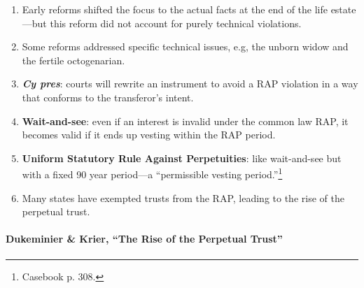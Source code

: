 \begin{enumerate}
    \item Early reforms shifted the focus to the actual facts at the end of 
    the life estate---but this reform did not account for purely technical 
    violations.
    \item Some reforms addressed specific technical issues, e.g, the unborn 
    widow and the fertile octogenarian.
    \item \textbf{\emph{Cy pres}}: courts will rewrite an instrument to avoid 
    a RAP violation in a way that conforms to the transferor's intent.
    \item \textbf{Wait-and-see}: even if an interest is invalid under the 
    common law RAP, it becomes valid if it ends up vesting within the RAP 
    period.
    \item \textbf{Uniform Statutory Rule Against Perpetuities}: like 
    wait-and-see but with a fixed 90 year period---a ``permissible vesting 
    period.''\footnote{Casebook p. 308.}
    \item Many states have exempted trusts from the RAP, leading to the rise 
    of the perpetual trust.
\end{enumerate}

\paragraph{Dukeminier \& Krier, ``The Rise of the Perpetual Trust''}

